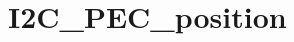 \hypertarget{group___i2_c___p_e_c__position}{\section{I2\-C\-\_\-\-P\-E\-C\-\_\-position}
\label{group___i2_c___p_e_c__position}
}
